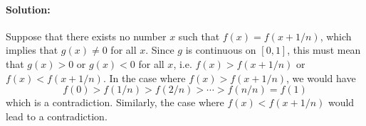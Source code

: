 \documentclass{article}
\begin{document}
\paragraph{Solution:} Suppose that there exists no number $x$ such that $f(x) =
f(x + 1/n)$, which implies that $g(x) \neq 0$ for all $x$. Since $g$ is
continuous on $[0, 1]$, this must mean that $g(x) > 0$ or $g(x) < 0$ for all
$x$, i.e. $f(x) > f(x + 1/n)$ or $f(x) < f(x + 1/n)$. In the case where $f(x) >
f(x + 1/n)$, we would have \begin{equation*}
  f(0) > f(1/n) > f(2/n) > \cdots > f(n/n) = f(1)
\end{equation*} which is a contradiction. Similarly, the case where $f(x) < f(x
+ 1/n)$ would lead to a contradiction.
\end{document}
